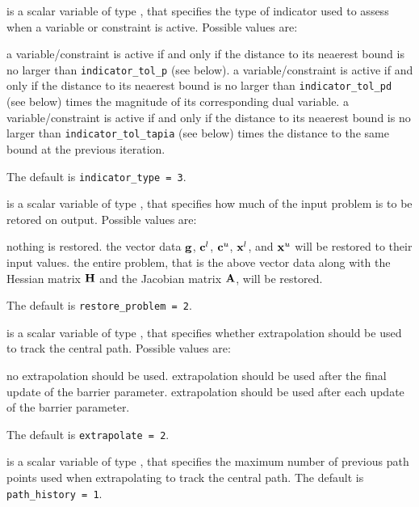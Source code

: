 \begin{description}

 is a scalar variable of type \integer, 
that specifies the type of indicator used to assess when a variable or
constraint is active.
Possible values are:

\begin{description}
 a variable/constraint is active if and only if the distance 
to its neaerest bound is no larger than {\tt indicator\_tol\-\_p} (see below).
 a variable/constraint is active if and only if the distance 
to its neaerest bound is no larger than {\tt indicator\_tol\-\_pd} 
(see below) times the magnitude of its corresponding dual variable.
 a variable/constraint is active if and only if the distance 
to its neaerest bound is no larger than {\tt indicator\_tol\-\_tapia} 
(see below) times the distance to the same bound at the previous iteration.
\end{description}
The default is {\tt indicator\_type = 3}.

 is a scalar variable of type \integer, that 
specifies how much of the input problem is to be retored on output. 
Possible values are:
\begin{description}
 nothing is restored. 
 the vector data ${\mathbf{g}}$, 
   ${\mathbf{c}}^{l}$, ${\mathbf{c}}^{u}$, ${\mathbf{x}}^{l}$, and ${\mathbf{x}}^{u}$ 
   will be restored to their input values.
 the entire problem, that is the above vector data along with 
the Hessian matrix ${\mathbf{H}}$ and the Jacobian matrix ${\mathbf{A}}$, will be restored.
\end{description}
The default is {\tt restore\_problem = 2}.

 is a scalar variable of type \integer, that 
specifies whether extrapolation should be used to track the central path. 
Possible values are:
\begin{description}
 no extrapolation should be used.
 extrapolation should be used after the final update of the barrier 
        parameter.
 extrapolation should be used after each update of the barrier 
        parameter.
\end{description}
The default is {\tt extrapolate = 2}.

 is a scalar variable of type \integer, that 
specifies the maximum number of previous path points used when extrapolating
to track the central path.
The default is {\tt path\_history = 1}.


\end{description}
